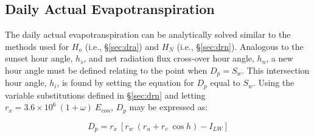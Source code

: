 \subsection{Daily Actual Evapotranspiration}
\label{sec:daet}
The daily actual evapotranspiration can be analytically solved similar to the methods used for $H_o$ (i.e., \S \ref{sec:dra}) and $H_N$ (i.e., \S \ref{sec:drn}). 
Analogous to the sunset hour angle, $h_s$, and net radiation flux cross-over hour angle, $h_n$, a new hour angle must be defined relating to the point when $D_p = S_w$. 
This intersection hour angle, $h_i$, is found by setting the equation for $D_p$ equal to $S_w$. 
Using the variable substitutions defined in \S \ref{sec:drn} and letting $r_x = 3.6\times10^6\: \left(1 + \omega \right)\: E_{con}$, $D_p$ may be expressed as:

\begin{equation}
\label{eq:dpb}
	D_p = r_x\: \left[
		      r_w\: \left(r_u + r_v\: \cos h \right)- I_{LW} 
		  \right]
\end{equation}

